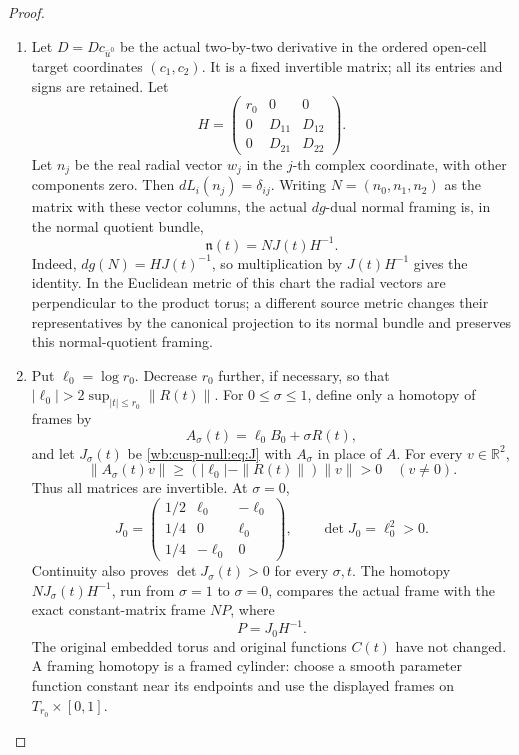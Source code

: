 \begin{proof}
\begin{enumerate}[label=\arabic*.,leftmargin=*]
\item Let \(D=Dc_{\overline u^0}\) be the actual two-by-two derivative in
the ordered open-cell target coordinates \((c_1,c_2)\). It is a fixed
invertible matrix; all its entries and signs are retained. Let
\[
 H=\begin{pmatrix}r_0&0&0\\0&D_{11}&D_{12}\\0&D_{21}&D_{22}\end{pmatrix}.
\]
Let \(n_j\) be the real radial vector \(w_j\) in the \(j\)-th complex
coordinate, with other components zero. Then \(dL_i(n_j)=\delta_{ij}\).
Writing \(N=(n_0,n_1,n_2)\) as the matrix with these vector columns, the actual
\(dg\)-dual normal framing is, in the normal quotient bundle,
\begin{equation}
 \mathfrak n(t)=N J(t)H^{-1}.
 \label{wb:cusp-null:eq:actual-frame}
\end{equation}
Indeed, \(dg(N)=HJ(t)^{-1}\), so multiplication by \(J(t)H^{-1}\)
gives the identity. In the Euclidean metric of this chart the radial
vectors are perpendicular to the product torus; a different source
metric changes their representatives by the canonical projection to its
normal bundle and preserves this normal-quotient framing.

\item Put \(\ell_0=\log r_0\). Decrease \(r_0\) further, if necessary, so
that \(|\ell_0|>2\sup_{|t|\leq r_0}\|R(t)\|\). For
\(0\leq\sigma\leq1\), define only a homotopy of frames by
\[
 A_\sigma(t)=\ell_0B_0+\sigma R(t),
\]
and let \(J_\sigma(t)\) be \eqref{wb:cusp-null:eq:J} with \(A_\sigma\) in place
of \(A\). For every \(v\in\mathbb R^2\),
\[
 \|A_\sigma(t)v\|\geq
 (|\ell_0|-\|R(t)\|)\|v\|>0\quad(v\ne0).
\]
Thus all matrices are invertible. At \(\sigma=0\),
\begin{equation}
 J_0=
 \begin{pmatrix}
 1/2&\ell_0&-\ell_0\\
 1/4&0&\ell_0\\
 1/4&-\ell_0&0
 \end{pmatrix},\qquad \det J_0=\ell_0^2>0.
 \label{wb:cusp-null:eq:J0}
\end{equation}
Continuity also proves \(\det J_\sigma(t)>0\) for every \(\sigma,t\).
The homotopy \(N J_\sigma(t)H^{-1}\), run from \(\sigma=1\) to
\(\sigma=0\), compares the actual frame with the exact constant-matrix
frame \(N P\), where
\begin{equation}
 P=J_0H^{-1}.
 \label{wb:cusp-null:eq:P}
\end{equation}
The original embedded torus and original functions \(C(t)\) have not
changed. A framing homotopy is a framed cylinder: choose a smooth
parameter function constant near its endpoints and use the displayed
frames on \(T_{r_0}\times[0,1]\).


\end{enumerate}
\end{proof}
